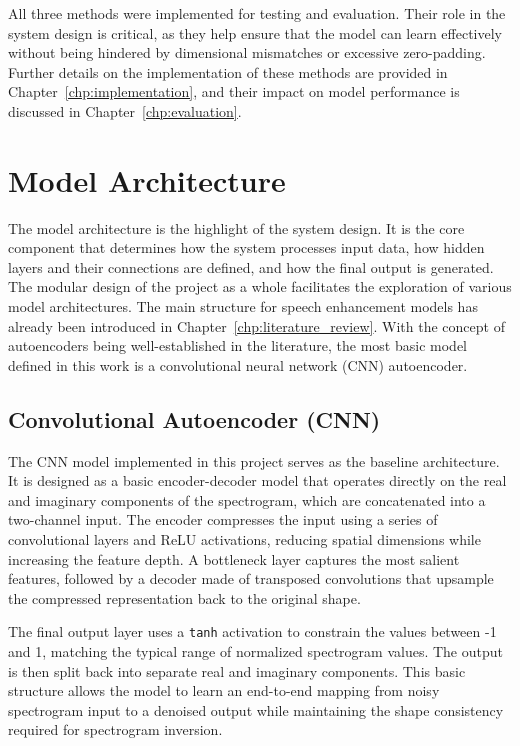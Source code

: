 All three methods were implemented for testing and evaluation. Their role in the system design is critical, as they help ensure that the model can learn effectively without being hindered by dimensional mismatches or excessive zero-padding. Further details on the implementation of these methods are provided in Chapter~\ref{chp:implementation}, and their impact on model performance is discussed in Chapter~\ref{chp:evaluation}.

\section{Model Architecture}
\label{sec:model_architecture}

The model architecture is the highlight of the system design. It is the core component that determines how the system processes input data, how hidden layers and their connections are defined, and how the final output is generated. The modular design of the project as a whole facilitates the exploration of various model architectures. The main structure for speech enhancement models has already been introduced in Chapter~\ref{chp:literature_review}. With the concept of autoencoders being well-established in the literature, the most basic model defined in this work is a convolutional neural network (CNN) autoencoder.

\subsection{Convolutional Autoencoder (CNN)}

The CNN model implemented in this project serves as the baseline architecture. It is designed as a basic encoder-decoder model that operates directly on the real and imaginary components of the spectrogram, which are concatenated into a two-channel input. The encoder compresses the input using a series of convolutional layers and ReLU activations, reducing spatial dimensions while increasing the feature depth. A bottleneck layer captures the most salient features, followed by a decoder made of transposed convolutions that upsample the compressed representation back to the original shape.

The final output layer uses a \texttt{tanh} activation to constrain the values between -1 and 1, matching the typical range of normalized spectrogram values. The output is then split back into separate real and imaginary components. This basic structure allows the model to learn an end-to-end mapping from noisy spectrogram input to a denoised output while maintaining the shape consistency required for spectrogram inversion.

